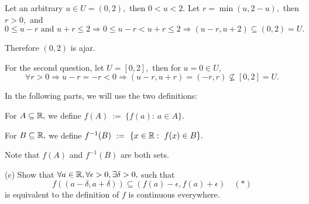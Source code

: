 \documentclass{article}
\begin{document}
\begin{soln}
    Let an arbitrary $u \in U = (0,2),$ then $0< u < 2.$ Let $r = \min(u, 2-u),$ then $r > 0,$ and
    \[
        0 \le u-r \text{\ and\ } u+r \le 2 \Rightarrow 0 \le u - r < u + r \le 2 \Rightarrow (u-r, u+2) \subseteq (0,2) = U.
    \]

    Therefore $(0,2)$ is ajar.

    For the second question, let $U = [0, 2],$ then for $u=0 \in U,$ 
    \[
        \forall r > 0 \Rightarrow u-r = -r < 0 \Rightarrow (u-r, u+r) = (-r, r) \not \subseteq [0,2] = U.
    \]
\end{soln}

\newpage

\begin{problem*}[Problem 4c]
    In the following parts, we will use the two definitions:
    
    For $A \subseteq \mathbb R,$ we define $f(A)\ :=\ \{ f(a):\ a \in A\}.$
    
    For $B \subseteq \mathbb R,$ we define $f^{-1}(B)\ :=\ \{ x \in \mathbb R:\ f(x) \in B\}.$

    Note that $f(A)$ and $f^{-1}(B)$ are both sets.

    (c) Show that $\forall a \in \mathbb R, \forall \epsilon > 0, \exists \delta > 0,$ such that
    \[
        f((a-\delta, a+\delta)) \subseteq (f(a) - \epsilon, f(a) + \epsilon) \quad (*)
    \]
    is equivalent to the definition of $f$ is continuous everywhere.
\end{problem*}
\end{document}
